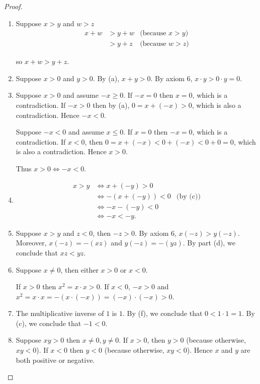 \begin{proof}
    \begin{enumerate}[label={(\alph*)}]
        \item Suppose $x > y$ and $w > z$
              \begin{align*}
                  x + w & > y + w & \text{(because $x > y$)} \\
                        & > y + z & \text{(because $w > z$)}
              \end{align*}

              so $x + w > y + z$.
        \item Suppose $x > 0$ and $y > 0$. By (a), $x + y > 0$. By axiom 6, $x\cdot y > 0\cdot y = 0$.
        \item Suppose $x > 0$ and assume $-x \geq 0$. If $-x = 0$ then $x = 0$, which is a contradiction. If $-x > 0$ then by (a), $0 = x + (-x) > 0$, which is also a contradiction. Hence $-x < 0$.

              Suppose $-x < 0$ and assume $x\leq 0$. If $x = 0$ then $-x = 0$, which is a contradiction. If $x < 0$, then $0 = x + (-x) < 0 + (-x) < 0 + 0 = 0$, which is also a contradiction. Hence $x > 0$.

              Thus $x > 0 \Leftrightarrow -x < 0$.
        \item \begin{align*}
                  x > y & \Longleftrightarrow x + (-y) > 0                      \\
                        & \Longleftrightarrow -(x + (-y)) < 0 & \text{(by (c))} \\
                        & \Longleftrightarrow -x - (-y) < 0                     \\
                        & \Longleftrightarrow -x < -y.
              \end{align*}
        \item Suppose $x > y$ and $z < 0$, then $-z > 0$. By axiom 6, $x(-z) > y(-z)$. Moreover, $x(-z) = -(xz)$ and $y(-z) = -(yz)$. By part (d), we conclude that $xz < yz$.
        \item Suppose $x\ne 0$, then either $x > 0$ or $x < 0$.

              If $x > 0$ then $x^{2} = x\cdot x > 0$. If $x < 0$, $-x > 0$ and $x^{2} = x\cdot x = -(x\cdot (-x)) = (-x)\cdot (-x) > 0$.
        \item The multiplicative inverse of $1$ is $1$. By (f), we conclude that $0 < 1\cdot 1 = 1$. By (c), we conclude that $-1 < 0$.
        \item Suppose $xy > 0$ then $x\ne 0, y\ne 0$. If $x > 0$, then $y > 0$ (because otherwise, $xy < 0$). If $x < 0$ then $y < 0$ (because otherwise, $xy < 0$). Hence $x$ and $y$ are both positive or negative.


\end{enumerate}
\end{proof}
